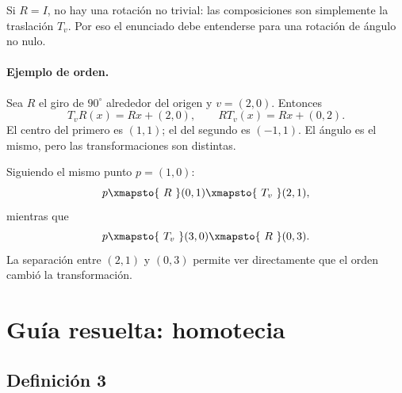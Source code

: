 \begin{center}
\end{center}

\begin{atencion}
Si \(R=I\), no hay una rotación no trivial: las composiciones son simplemente la traslación
\(T_v\). Por eso el enunciado debe entenderse para una rotación de ángulo no nulo.
\end{atencion}

\paragraph{Ejemplo de orden.}
Sea \(R\) el giro de \(90^\circ\) alrededor del origen y \(v=(2,0)\). Entonces
\[
  T_vR(x)=Rx+(2,0),
  \qquad
  RT_v(x)=Rx+(0,2).
\]
El centro del primero es \((1,1)\); el del segundo es \((-1,1)\). El ángulo es el mismo,
pero las transformaciones son distintas.

Siguiendo el mismo punto \(p=(1,0)\):
\[
p\xmapsto{\ R\ }(0,1)
\xmapsto{\ T_v\ }(2,1),
\]
mientras que
\[
p\xmapsto{\ T_v\ }(3,0)
\xmapsto{\ R\ }(0,3).
\]
La separación entre \((2,1)\) y \((0,3)\) permite ver directamente que el orden cambió la
transformación.

\section{Guía resuelta: homotecia}

\subsection{Definición 3}

